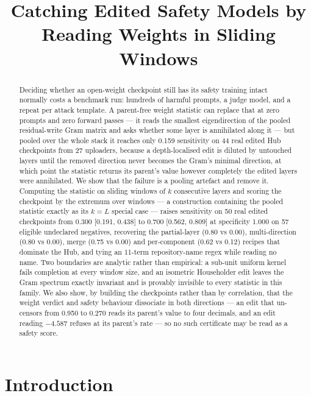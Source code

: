\documentclass[11pt,letterpaper]{article}
\title{Catching Edited Safety Models by Reading Weights in Sliding Windows}
\author{}
\date{}
\begin{document}
\maketitle

\begin{abstract}
Deciding whether an open-weight checkpoint still has its safety training intact normally costs a benchmark run: hundreds of harmful prompts, a judge model, and a repeat per attack template. A parent-free weight statistic can replace that at zero prompts and zero forward passes --- it reads the smallest eigendirection of the pooled residual-write Gram matrix and asks whether some layer is annihilated along it --- but pooled over the whole stack it reaches only 0.159 sensitivity on 44 real edited Hub checkpoints from 27 uploaders, because a depth-localised edit is diluted by untouched layers until the removed direction never becomes the Gram's minimal direction, at which point the statistic returns its parent's value however completely the edited layers were annihilated. We show that the failure is a pooling artefact and remove it. Computing the statistic on sliding windows of $k$ consecutive layers and scoring the checkpoint by the extremum over windows --- a construction containing the pooled statistic exactly as its $k=L$ special case --- raises sensitivity on 50 real edited checkpoints from 0.300 [0.191, 0.438] to 0.700 [0.562, 0.809] at specificity 1.000 on 57 eligible undeclared negatives, recovering the partial-layer (0.80 vs 0.00), multi-direction (0.80 vs 0.00), merge (0.75 vs 0.00) and per-component (0.62 vs 0.12) recipes that dominate the Hub, and tying an 11-term repository-name regex while reading no name. Two boundaries are analytic rather than empirical: a sub-unit uniform kernel fails completion at every window size, and an isometric Householder edit leaves the Gram spectrum exactly invariant and is provably invisible to every statistic in this family. We also show, by building the checkpoints rather than by correlation, that the weight verdict and safety behaviour dissociate in both directions --- an edit that un-censors from 0.950 to 0.270 reads its parent's value to four decimals, and an edit reading $-4.587$ refuses at its parent's rate --- so no such certificate may be read as a safety score.
\end{abstract}

\section{Introduction}
\end{document}
